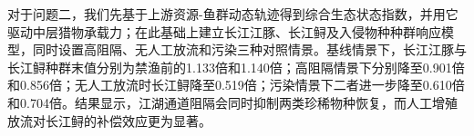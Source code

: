 对于问题二，我们先基于上游资源-鱼群动态轨迹得到综合生态状态指数，并用它驱动中层猎物承载力；在此基础上建立长江江豚、长江鲟及入侵物种种群响应模型，同时设置高阻隔、无人工放流和污染三种对照情景。基线情景下，长江江豚与长江鲟种群末值分别为禁渔前的1.133倍和1.140倍；高阻隔情景下分别降至0.901倍和0.856倍；无人工放流时长江鲟降至0.519倍；污染情景下二者进一步降至0.610倍和0.704倍。结果显示，江湖通道阻隔会同时抑制两类珍稀物种恢复，而人工增殖放流对长江鲟的补偿效应更为显著。
